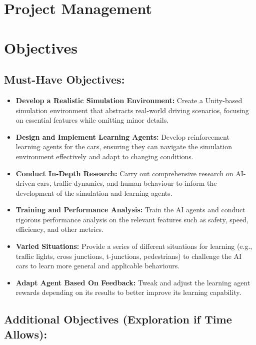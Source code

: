 \documentclass{article}
\begin{document}
\section{Project Management}
\lipsum[2][1]

\section{Objectives}
\subsection{Must-Have Objectives:}
\begin{itemize}
\item \textbf{Develop a Realistic Simulation Environment:} Create a Unity-based simulation environment that abstracts real-world driving scenarios, focusing on essential features while omitting minor details.

\item \textbf{Design and Implement Learning Agents:} Develop reinforcement learning agents for the cars, ensuring they can navigate the simulation environment effectively and adapt to changing conditions.

\item \textbf{Conduct In-Depth Research:} Carry out comprehensive research on AI-driven cars, traffic dynamics, and human behaviour to inform the development of the simulation and learning agents.

\item \textbf{Training and Performance Analysis:} Train the AI agents and conduct rigorous performance analysis on the relevant features such as safety, speed, efficiency, and other metrics.

\item \textbf{Varied Situations:} Provide a series of different situations for learning (e.g., traffic lights, cross junctions, t-junctions, pedestrians) to challenge the AI cars to learn more general and applicable behaviours.

\item \textbf{Adapt Agent Based On Feedback:} Tweak and adjust the learning agent rewards depending on its results to better improve its learning capability.

\end{itemize}

\subsection{Additional Objectives (Exploration if Time Allows):}
\end{document}
